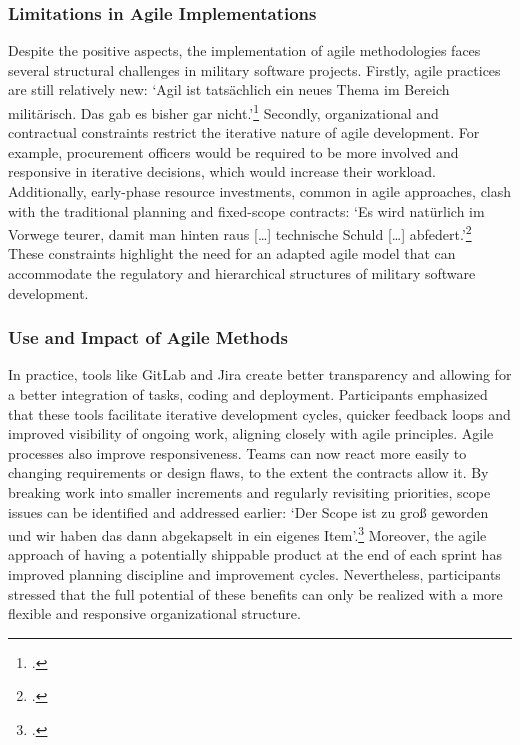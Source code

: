\subsubsection{Limitations in Agile Implementations}
Despite the positive aspects, the implementation of agile methodologies faces several structural challenges in military software projects. Firstly, agile practices are still relatively new: `Agil ist tatsächlich ein neues Thema im Bereich militärisch. Das gab es bisher gar nicht.'\footcite{Interview12025}
Secondly, organizational and contractual constraints restrict the iterative nature of agile development. For example, procurement officers would be required to be more involved and responsive in iterative decisions, which would increase their workload. Additionally, early-phase resource investments, common in agile approaches,
clash with the traditional planning and fixed-scope contracts: `Es wird natürlich im Vorwege teurer, damit man hinten raus [\ldots] technische Schuld [\ldots] abfedert.'\footcite{Interview12025} These constraints highlight the need for an adapted agile model that can accommodate the regulatory and hierarchical structures of military software development.\\

\subsubsection{Use and Impact of Agile Methods}
In practice, tools like GitLab and Jira create better transparency and allowing for a better integration of tasks, coding and deployment. Participants emphasized that these tools facilitate iterative development cycles, quicker feedback loops and 
improved visibility of ongoing work, aligning closely with agile principles. 
Agile processes also improve responsiveness. Teams can now react more easily to changing requirements or design flaws, to the extent the contracts allow it. By breaking work into smaller increments and regularly revisiting priorities, scope issues can be identified and addressed earlier:
`Der Scope ist zu groß geworden und wir haben das dann abgekapselt in ein eigenes Item'.\footcite{Interview32025} Moreover, the agile approach of having a potentially shippable product at the end of each sprint has improved planning discipline and improvement cycles.
Nevertheless, participants stressed that the full potential of these benefits can only be realized with a more flexible and responsive organizational structure.\\

